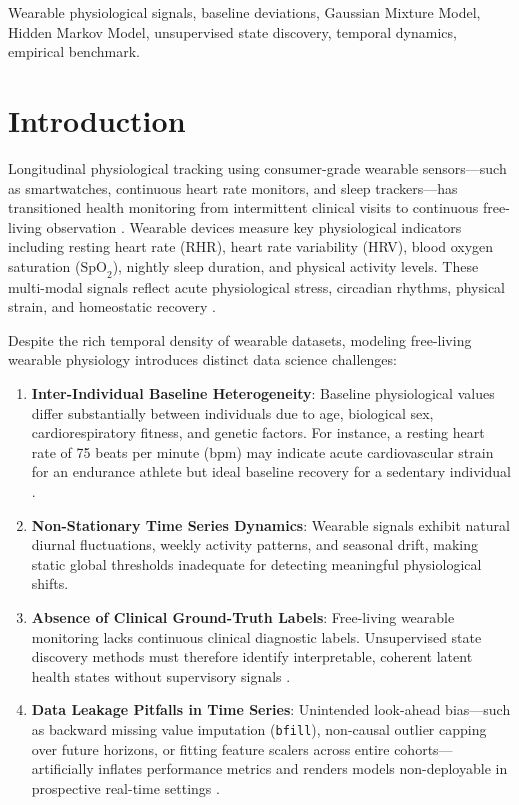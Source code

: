 \documentclass[conference]{IEEEtran}
\begin{document}
\begin{IEEEkeywords}
Wearable physiological signals, baseline deviations, Gaussian Mixture Model, Hidden Markov Model, unsupervised state discovery, temporal dynamics, empirical benchmark.
\end{IEEEkeywords}

\section{Introduction}
Longitudinal physiological tracking using consumer-grade wearable sensors—such as smartwatches, continuous heart rate monitors, and sleep trackers—has transitioned health monitoring from intermittent clinical visits to continuous free-living observation \cite{b1}. Wearable devices measure key physiological indicators including resting heart rate (RHR), heart rate variability (HRV), blood oxygen saturation ($\text{SpO}_2$), nightly sleep duration, and physical activity levels. These multi-modal signals reflect acute physiological stress, circadian rhythms, physical strain, and homeostatic recovery \cite{b2}.

Despite the rich temporal density of wearable datasets, modeling free-living wearable physiology introduces distinct data science challenges:
\begin{enumerate}
    \item \textbf{Inter-Individual Baseline Heterogeneity}: Baseline physiological values differ substantially between individuals due to age, biological sex, cardiorespiratory fitness, and genetic factors. For instance, a resting heart rate of 75 beats per minute (bpm) may indicate acute cardiovascular strain for an endurance athlete but ideal baseline recovery for a sedentary individual \cite{b3}.
    \item \textbf{Non-Stationary Time Series Dynamics}: Wearable signals exhibit natural diurnal fluctuations, weekly activity patterns, and seasonal drift, making static global thresholds inadequate for detecting meaningful physiological shifts.
    \item \textbf{Absence of Clinical Ground-Truth Labels}: Free-living wearable monitoring lacks continuous clinical diagnostic labels. Unsupervised state discovery methods must therefore identify interpretable, coherent latent health states without supervisory signals \cite{b4}.
    \item \textbf{Data Leakage Pitfalls in Time Series}: Unintended look-ahead bias—such as backward missing value imputation (\texttt{bfill}), non-causal outlier capping over future horizons, or fitting feature scalers across entire cohorts—artificially inflates performance metrics and renders models non-deployable in prospective real-time settings \cite{b5}.
\end{enumerate}
\end{document}
